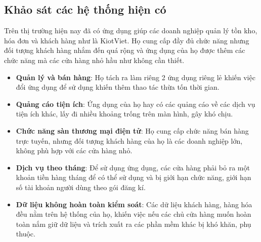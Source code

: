 \documentclass[../DoAn.tex]{subfiles}
\begin{document}
\subsection{Khảo sát các hệ thống hiện có}
\label{section:2.1.2}
Trên thị trường hiện nay đã có ứng dụng giúp các doanh nghiệp quản lý tồn kho, hóa đơn và khách hàng như là KiotViet. Họ cung cấp đầy đủ chức năng nhưng đối tượng khách hàng nhắm đến quá rộng và ứng dụng của họ được thêm các chức năng mà các cửa hàng nhỏ hầu như không cần thiết.
\begin{itemize}
    \item \textbf{Quản lý và bán hàng}: Họ tách ra làm riêng 2 ứng dụng riêng lẻ khiến việc đổi ứng dụng để sử dụng khiến thêm thao tác thừa tốn thời gian.
    \item \textbf{Quảng cáo tiện ích}: Ứng dụng của họ hay có các quảng cáo về các dịch vụ tiện ích khác, lấy đi nhiều khoảng trống trên màn hình, gây khó chịu.
    \item \textbf{Chức năng sàn thương mại điện tử}: Họ cung cấp chức năng bán hàng trực tuyến, nhưng đối tượng khách hàng của họ là các doanh nghiệp lớn, không phù hợp với các cửa hàng nhỏ.
    \item \textbf{Dịch vụ theo tháng}: Để sử dụng ứng dụng, các cửa hàng phải bỏ ra một khoản tiền hàng tháng để có thể sử dụng và bị giới hạn chức năng, giới hạn số tài khoản người dùng theo gói đăng kí.
    \item \textbf{Dữ liệu không hoàn toàn kiểm soát}: Các dữ liệu khách hàng, hàng hóa đều nằm trên hệ thống của họ, khiến việc nếu các chủ cửa hàng muốn hoàn toàn nắm giữ dữ liệu và trích xuất ra các phần mềm khác bị khó khăn, phụ thuộc.
\end{itemize}
\vfill
\break
\end{document}
